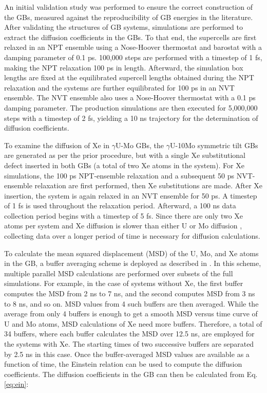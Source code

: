 \documentclass{elsarticle}
\begin{document}
An initial validation study was performed to ensure the correct construction of the GBs, measured against the reproducibility of GB energies in the literature. After validating the structures of GB systems, simulations are performed to extract the diffusion coefficients in the GBs. To that end, the supercells are first relaxed in an NPT ensemble using a Nose-Hoover thermostat and barostat with a damping parameter of 0.1 ps. 100,000 steps are performed with a timestep of 1 fs, making the NPT relaxation 100 ps in length. Afterward, the simulation box lengths are fixed at the equilibrated supercell lengths obtained during the NPT relaxation and the systems are further equilibrated for 100 ps in an NVT ensemble. The NVT ensemble also uses a Nose-Hoover thermostat with a 0.1 ps damping parameter. The production simulations are then executed for 5,000,000 steps with a timestep of 2 fs, yielding a 10 ns trajectory for the determination of diffusion coefficients.

To examine the diffusion of Xe in $\gamma$U-Mo GBs, the $\gamma$U-10Mo symmetric tilt GBs are generated as per the prior procedure, but with a single Xe substitutional defect inserted in both GBs (a total of two Xe atoms in the system). For Xe simulations, the 100 ps NPT-ensemble relaxation and a subsequent 50 ps NVT-ensemble relaxation are first performed, then Xe substitutions are made. After Xe insertion, the system is again relaxed in an NVT ensemble for 50 ps. A timestep of 1 fs is used throughout the relaxation period. Afterward, a 100 ns data collection period begins with a timestep of 5 fs. Since there are only two Xe atoms per system and Xe diffusion is slower than either U or Mo diffusion \cite{park2023}, collecting data over a longer period of time is necessary for diffusion calculations.

To calculate the mean squared displacement (MSD) of the U, Mo, and Xe atoms in the GB, a buffer averaging scheme is deployed as described in \cite{rapaport2004}. In this scheme, multiple parallel MSD calculations are performed over subsets of the full simulations. For example, in the case of systems without Xe, the first buffer computes the MSD from 2 ns to 7 ns, and the second computes MSD from 3 ns to 8 ns, and so on. MSD values from 4 such buffers are then averaged. While the average from only 4 buffers is enough to get a smooth MSD versus time curve of U and Mo atoms, MSD calculations of Xe need more buffers. Therefore, a total of 34 buffers, where each buffer calculates the MSD over 12.5 ns, are employed for the systems with Xe. The starting times of two successive buffers are separated by 2.5 ns in this case. Once the buffer-averaged MSD values are available as a function of time, the Einstein relation can be used to compute the diffusion coefficients. The diffusion coefficients in the GB can then be calculated from Eq. \ref{eq:ein}:
\end{document}
